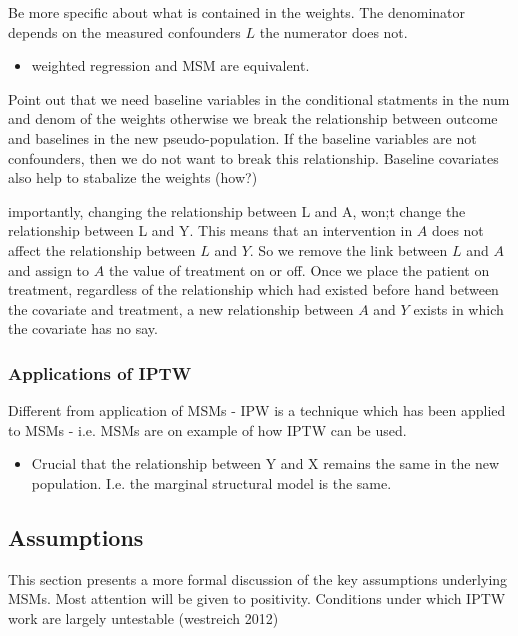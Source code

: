 \documentclass[11pt]{article}
\providecommand{\tightlist}{%
      \setlength{\itemsep}{0pt}\setlength{\parskip}{0pt}}
\begin{document}
Be more specific about what is contained in the weights. The denominator
depends on the measured confounders \(L\) the numerator does not.

\begin{itemize}
\tightlist
\item
  weighted regression and MSM are equivalent.
\end{itemize}

Point out that we need baseline variables in the conditional statments
in the num and denom of the weights otherwise we break the relationship
between outcome and baselines in the new pseudo-population. If the
baseline variables are not confounders, then we do not want to break
this relationship. Baseline covariates also help to stabalize the
weights (how?)

importantly, changing the relationship between L and A, won;t change the
relationship between L and Y. This means that an intervention in \(A\)
does not affect the relationship between \(L\) and \(Y\). So we remove
the link between \(L\) and \(A\) and assign to \(A\) the value of
treatment on or off. Once we place the patient on treatment, regardless
of the relationship which had existed before hand between the covariate
and treatment, a new relationship between \(A\) and \(Y\) exists in
which the covariate has no say.

\subsubsection{Applications of IPTW}\label{applications-of-iptw}

Different from application of MSMs - IPW is a technique which has been
applied to MSMs - i.e. MSMs are on example of how IPTW can be used.

\begin{itemize}
\tightlist
\item
  Crucial that the relationship between Y and X remains the same in the
  new population. I.e. the marginal structural model is the same.
\end{itemize}

    \subsection{Assumptions}\label{assumptions}

This section presents a more formal discussion of the key assumptions
underlying MSMs. Most attention will be given to positivity. Conditions
under which IPTW work are largely untestable (westreich 2012)
\end{document}
